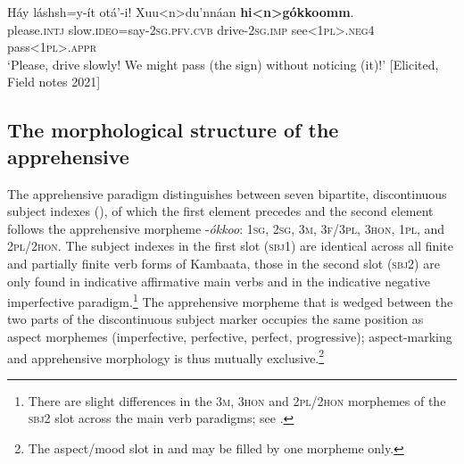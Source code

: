 \documentclass[output=paper,colorlinks,citecolor=brown,
]{langsci/langscibook}
\begin{document}
\ea\label{ex:treis:4add}  
\gll Háy láshsh=y-ít otá'-i! Xuu<n>du'nnáan \textbf{hi<n>gókkoomm}.\\ 
please.\textsc{intj} slow.\textsc{ideo}=say-\textsc{2sg.pfv.cvb} drive-\textsc{2sg.imp} see\textsc{<1pl>.neg4} pass\textsc{<1pl>.appr} \\
\glt `Please, drive slowly! We might pass (the sign) without noticing (it)!'  [Elicited, Field notes 2021]
\z

\subsection{The morphological structure of the apprehensive}\label{sec:treis:2.2}

The apprehensive paradigm distinguishes between seven bipartite, discontinuous subject indexes (), of which the first element precedes and the second element follows the apprehensive morpheme \nobreakdash-\textit{ókkoo}: \textsc{1sg,} \textsc{2sg}, \textsc{3m}, \textsc{3f/3pl}, \textsc{3hon}, \textsc{1pl}, and \textsc{2pl/2hon}. The subject indexes in the first slot (\textsc{sbj1}) are identical across all finite and partially finite verb forms of Kambaata, those in the second slot (\textsc{sbj2}) are only found in indicative affirmative main verbs and in the indicative negative imperfective paradigm.\footnote{There are slight differences in the \textsc{3m}, \textsc{3hon} and \textsc{2pl/2hon} morphemes of the \textsc{sbj2} slot across the main verb paradigms; see .}  The apprehensive morpheme that is wedged between the two parts of the discontinuous subject marker occupies the same position as aspect morphemes (imperfective, perfective, perfect, progressive); aspect-marking and apprehensive morphology is thus mutually exclusive.\footnote{The aspect\slash mood slot in  and  may be filled by one morpheme only.} 
\end{document}
